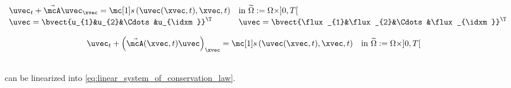 \begin{defnbox}\nospacing
    \begin{defn}
        \label{defn:linear_system_of_conservation_laws}
        \begin{align}
          &\uvec_{t}+\linfluxvec\uvec_{\xvec}=\sourceterm\left(\uvec(\xvec,t),\xvec,t\right)&&
                                                                                         \text{in }\widetilde{\Omega}:=\Omega\times]0,T[\nonumber \\[-1\jot]
          &\uvec=\bvect{u_{1}&u_{2}&\Cdots&u_{\idxm}}^{\T}&&\uvec=\bvect{\flux_{1}&\flux_{2}&\Cdots&\flux_{\idxm}}^{\T}\label{eq:linear_system_of_conservation_law}
        \end{align}
    \end{defn}
\end{defnbox}
\begin{corbox}\nospacing
    \begin{cor}\label{cor:linear_system_of_conservation_laws_with_variable_coefficients}
        \begin{align}
          &\uvec_{t}+\left(\linfluxvec(\xvec,t)\uvec\right)_{\xvec}=\sourceterm\left(\uvec(\xvec,t),\xvec,t\right)&&
                    \text{in }\widetilde{\Omega}:=\Omega\times]0,T[\label{eq:linear_system_of_conservation_law_variable_coef}
        \end{align}
    \end{cor}
\end{corbox}
\begin{corbox}\nospacing
    \begin{cor}
        \label{cor:linearizing_systems_of_consveration_laws}
        \leavevmode\\
         can be linearized into \cref{eq:linear_system_of_conservation_law}.
    \end{cor}
\end{corbox}
